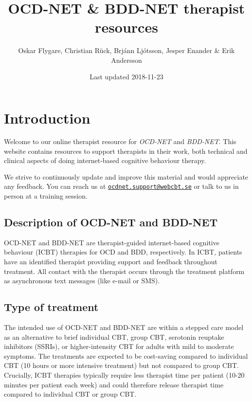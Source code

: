 \documentclass[]{book}
\title{OCD-NET \& BDD-NET therapist resources}
\author{Oskar Flygare, Christian Rück, Brjánn Ljótsson, Jesper Enander \& Erik
Andersson}
\date{Last updated 2018-11-23}
\theoremstyle{definition}
\theoremstyle{definition}
\theoremstyle{definition}
\theoremstyle{remark}
\begin{document}
\maketitle

{
\setcounter{tocdepth}{1}
\tableofcontents
}
\hypertarget{introduction}{%
\chapter{Introduction}\label{introduction}}

Welcome to our online therapist resource for \emph{OCD-NET} and
\emph{BDD-NET}. This website contains resources to support therapists in
their work, both technical and clinical aspects of doing internet-based
cognitive behaviour therapy.

We strive to continuously update and improve this material and would
appreciate any feedback. You can reach us at
\href{mailto:ocdnet.support@webcbt.se}{\nolinkurl{ocdnet.support@webcbt.se}}
or talk to us in person at a training session.

\hypertarget{description-of-ocd-net-and-bdd-net}{%
\section{Description of OCD-NET and
BDD-NET}\label{description-of-ocd-net-and-bdd-net}}

OCD-NET and BDD-NET are therapist-guided internet-based cognitive
behaviour (ICBT) therapies for OCD and BDD, respectively. In ICBT,
patients have an identified therapist providing support and feedback
throughout treatment. All contact with the therapist occurs through the
treatment platform as asynchronous text messages (like e-mail or SMS).

\hypertarget{type-of-treatment}{%
\section{Type of treatment}\label{type-of-treatment}}

The intended use of OCD-NET and BDD-NET are within a stepped care model
as an alternative to brief individual CBT, group CBT, serotonin reuptake
inhibitors (SSRIs), or higher-intensity CBT for adults with mild to
moderate symptoms. The treatments are expected to be cost-saving
compared to individual CBT (10 hours or more intensive treatment) but
not compared to group CBT. Crucially, ICBT therapies typically require
less therapist time per patient (10-20 minutes per patient each week)
and could therefore release therapist time compared to individual CBT or
group CBT.
\end{document}
